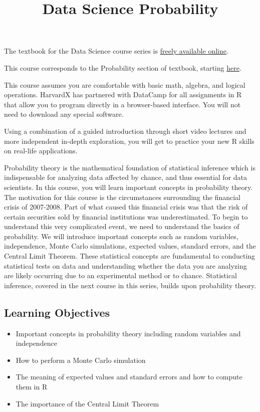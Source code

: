 \documentclass[
]{article}
\title{Data Science Probability}
\author{}
\date{\vspace{-2.5em}}
\providecommand{\tightlist}{%
  \setlength{\itemsep}{0pt}\setlength{\parskip}{0pt}}
\begin{document}
\maketitle

The textbook for the Data Science course series is
\href{https://rafalab.github.io/dsbook/}{freely available online}.

This course corresponds to the Probability section of textbook, starting
\href{https://rafalab.github.io/dsbook/probability.html}{here}.

This course assumes you are comfortable with basic math, algebra, and
logical operations. HarvardX has partnered with DataCamp for all
assignments in R that allow you to program directly in a browser-based
interface. You will not need to download any special software.

Using a combination of a guided introduction through short video
lectures and more independent in-depth exploration, you will get to
practice your new R skills on real-life applications.

Probability theory is the mathematical foundation of statistical
inference which is indispensable for analyzing data affected by chance,
and thus essential for data scientists. In this course, you will learn
important concepts in probability theory. The motivation for this course
is the circumstances surrounding the financial crisis of 2007-2008. Part
of what caused this financial crisis was that the risk of certain
securities sold by financial institutions was underestimated. To begin
to understand this very complicated event, we need to understand the
basics of probability. We will introduce important concepts such as
random variables, independence, Monte Carlo simulations, expected
values, standard errors, and the Central Limit Theorem. These
statistical concepts are fundamental to conducting statistical tests on
data and understanding whether the data you are analyzing are likely
occurring due to an experimental method or to chance. Statistical
inference, covered in the next course in this series, builds upon
probability theory.

\hypertarget{learning-objectives}{%
\subsection{Learning Objectives}\label{learning-objectives}}

\begin{itemize}
\tightlist
\item
  Important concepts in probability theory including random variables
  and independence
\item
  How to perform a Monte Carlo simulation
\item
  The meaning of expected values and standard errors and how to compute
  them in R
\item
  The importance of the Central Limit Theorem
\end{itemize}
\end{document}
